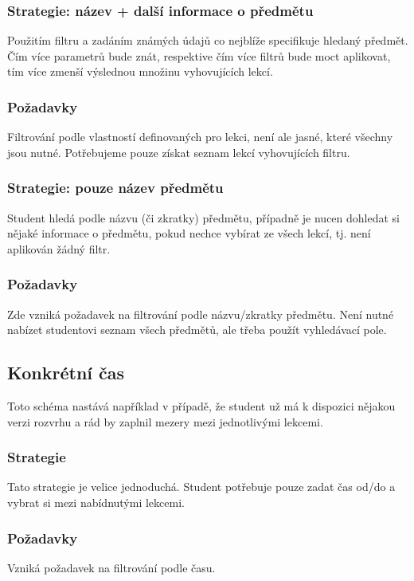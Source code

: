 \documentclass[a4paper, 11pt]{article}
\begin{document}
\subsubsection{Strategie: název + další informace o předmětu}
Použitím filtru a zadáním známých údajů co nejblíže specifikuje hledaný předmět. Čím více parametrů bude znát, respektive čím více filtrů bude moct aplikovat, tím více zmenší výslednou množinu vyhovujících lekcí.

\subsubsection{Požadavky}
Filtrování podle vlastností definovaných pro lekci, není ale jasné, které všechny jsou nutné. Potřebujeme pouze získat seznam lekcí vyhovujících filtru.

\subsubsection{Strategie: pouze název předmětu}
Student hledá podle názvu (či zkratky) předmětu, případně je nucen dohledat si nějaké informace o předmětu, pokud nechce vybírat ze všech lekcí, tj. není aplikován žádný filtr.

\subsubsection{Požadavky}
Zde vzniká požadavek na filtrování podle názvu/zkratky předmětu. Není nutné nabízet studentovi seznam všech předmětů, ale třeba použít vyhledávací pole.

\subsection{Konkrétní čas}
Toto schéma nastává například v případě, že student už má k dispozici nějakou verzi rozvrhu a rád by zaplnil mezery mezi jednotlivými lekcemi.

\subsubsection{Strategie}
Tato strategie je velice jednoduchá. Student potřebuje pouze zadat čas od/do a vybrat si mezi nabídnutými lekcemi.

\subsubsection{Požadavky}
Vzniká požadavek na filtrování podle času.
\end{document}
